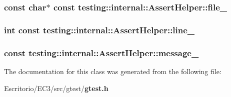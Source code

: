 \subsubsection{\setlength{\rightskip}{0pt plus 5cm}const char$\ast$ const {\bf testing::internal::AssertHelper::file\_\-}\hspace{0.3cm}{\tt  [private]}}\label{classtesting_1_1internal_1_1AssertHelper_2f390e195e3b1ea244c62d77c6d39051}


\subsubsection{\setlength{\rightskip}{0pt plus 5cm}int const {\bf testing::internal::AssertHelper::line\_\-}\hspace{0.3cm}{\tt  [private]}}\label{classtesting_1_1internal_1_1AssertHelper_7c7cef5c21780f81b597233bccaacbe3}


\subsubsection{ const {\bf testing::internal::AssertHelper::message\_\-}\hspace{0.3cm}{\tt  [private]}}\label{classtesting_1_1internal_1_1AssertHelper_fa76642e1a4a34a970bcd5a2360bafa7}




The documentation for this class was generated from the following file:\begin{CompactItemize}
\item 
Escritorio/EC3/src/gtest/{\bf gtest.h}\end{CompactItemize}
